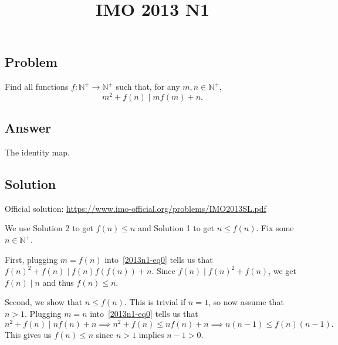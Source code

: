 \documentclass{article}
\title{IMO 2013 N1}
\author{}
\date{}
\newcommand{\N}{\mathbb{N}}
\begin{document}
\maketitle



\subsection*{Problem}

Find all functions $f : \N^+ \to \N^+$ such that, for any $m, n \in \N^+$,
\[ m^2 + f(n) \mid m f(m) + n. \tag{*}\label{2013n1-eq0} \]



\subsection*{Answer}

The identity map.



\subsection*{Solution}

Official solution: \url{https://www.imo-official.org/problems/IMO2013SL.pdf}

We use Solution 2 to get $f(n) \leq n$ and Solution 1 to get $n \leq f(n)$.
Fix some $n \in \N^+$.

First, plugging $m = f(n)$ into~\eqref{2013n1-eq0} tells us that $f(n)^2 + f(n) \mid f(n) f(f(n)) + n$.
Since $f(n) \mid f(n)^2 + f(n)$, we get $f(n) \mid n$ and thus $f(n) \leq n$.

Second, we show that $n \leq f(n)$.
This is trivial if $n = 1$, so now assume that $n > 1$.
Plugging $m = n$ into~\eqref{2013n1-eq0} tells us that
\[ n^2 + f(n) \mid n f(n) + n \implies n^2 + f(n) \leq n f(n) + n \implies n(n - 1) \leq f(n) (n - 1). \]
This gives us $f(n) \leq n$ since $n > 1$ implies $n - 1 > 0$.
\end{document}
